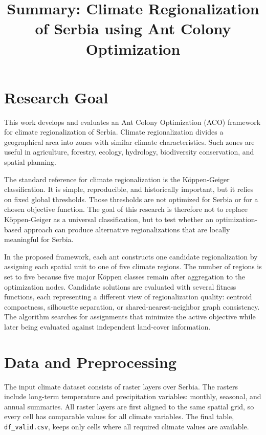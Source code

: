 \documentclass[11pt]{article}
\title{Summary: Climate Regionalization of Serbia using Ant Colony Optimization}
\date{}
\begin{document}
\maketitle

\section*{Research Goal}

This work develops and evaluates an Ant Colony Optimization (ACO) framework for climate regionalization of Serbia. Climate regionalization divides a geographical area into zones with similar climate characteristics. Such zones are useful in agriculture, forestry, ecology, hydrology, biodiversity conservation, and spatial planning.

The standard reference for climate regionalization is the Köppen-Geiger classification. It is simple, reproducible, and historically important, but it relies on fixed global thresholds. Those thresholds are not optimized for Serbia or for a chosen objective function. The goal of this research is therefore not to replace Köppen-Geiger as a universal classification, but to test whether an optimization-based approach can produce alternative regionalizations that are locally meaningful for Serbia.

In the proposed framework, each ant constructs one candidate regionalization by assigning each spatial unit to one of five climate regions. The number of regions is set to five because five major Köppen classes remain after aggregation to the optimization nodes. Candidate solutions are evaluated with several fitness functions, each representing a different view of regionalization quality: centroid compactness, silhouette separation, or shared-nearest-neighbor graph consistency. The algorithm searches for assignments that minimize the active objective while later being evaluated against independent land-cover information.

\section*{Data and Preprocessing}

The input climate dataset consists of raster layers over Serbia. The rasters include long-term temperature and precipitation variables: monthly, seasonal, and annual summaries. All raster layers are first aligned to the same spatial grid, so every cell has comparable values for all climate variables. The final table, \texttt{df\_valid.csv}, keeps only cells where all required climate values are available.
\end{document}
